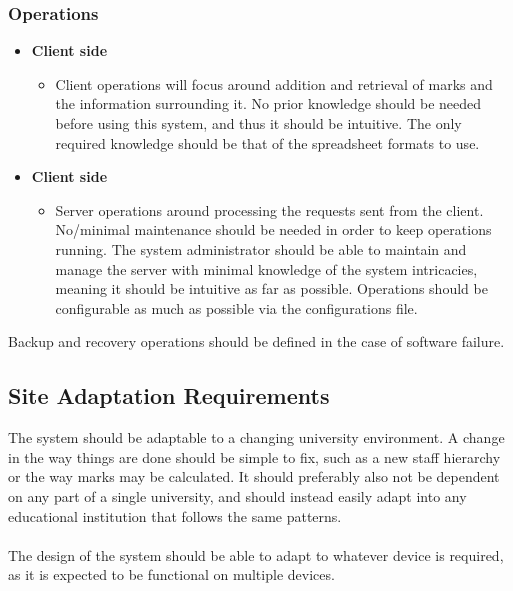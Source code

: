 \documentclass[a4paper,12pt]{article}
\begin{document}
            \subsubsection{Operations}
            
              
            \begin{itemize}
            	\item \textbf{Client side}
            	\begin{itemize}
            		\item Client operations will focus around addition and retrieval of marks and the information surrounding it. No prior knowledge should be needed before using this system, and thus it should be intuitive. The only required knowledge should be that of the spreadsheet formats to use.
            	\end{itemize}
            \end{itemize}
        
        	  
        	\begin{itemize}
        		\item \textbf{Client side}
        		\begin{itemize}
        			\item Server operations around processing the requests sent from the client. No/minimal maintenance should be needed in order to keep operations running. The system administrator should be able to maintain and manage the server with minimal knowledge of the system intricacies, meaning it should be intuitive as far as possible. Operations should be configurable as much as possible via the configurations file. 
        		\end{itemize}
        	\end{itemize}
        
            Backup and recovery operations should be defined in the case of software failure. 
            
            \subsection{Site Adaptation Requirements}
            
            The system should be adaptable to a changing university environment. A change in the way things are done should be simple to fix, such as a new staff hierarchy or the way marks may be calculated. It should preferably also not be dependent on any part of a single university, and should instead easily adapt into any educational institution that follows the same patterns.\\\\            
            The design of the system should be able to adapt to whatever device is required, as it is expected to be functional on multiple devices. 
            
\end{document}
